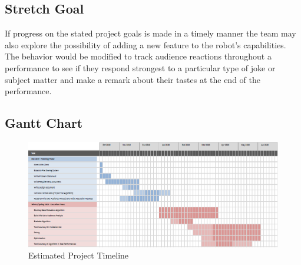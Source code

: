 \documentclass[onecolumn, draftclsnofoot,10pt, compsoc]{IEEEtran}
\begin{document}
\subsection{Stretch Goal}
If progress on the stated project goals is made in a timely manner the team may also explore the possibility of adding a new feature to the robot's capabilities. The behavior would be modified to track audience reactions throughout a performance to see if they respond strongest to a particular type of joke or subject matter and make a remark about their tastes at the end of the performance.

\newpage
\subsection{Gantt Chart}
\begin{figure}[ht]
\includegraphics[width=\linewidth]{gantt.eps}
\caption{Estimated Project Timeline}
\end{figure}
\end{document}
